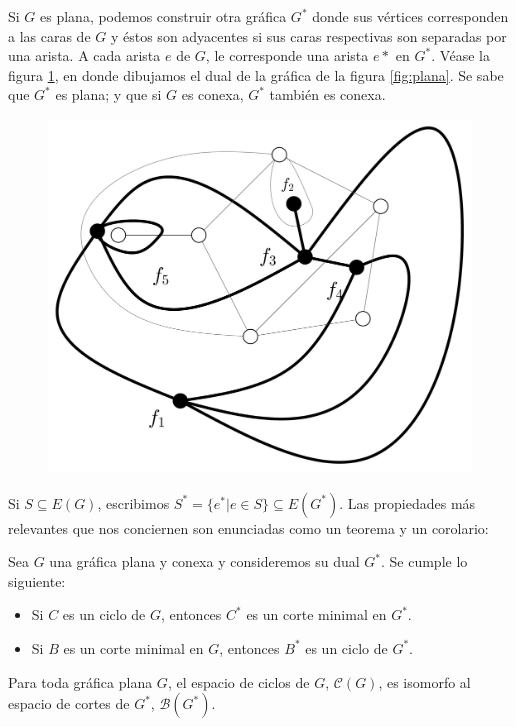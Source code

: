 Si $G$ es plana, podemos construir otra gráfica $G^{*}$ donde sus vértices corresponden a las caras de $G$ y éstos son adyacentes si sus caras respectivas son separadas por una arista. A cada arista $e$ de $G$, le corresponde una arista $e*$ en $G^{*}$. Véase la figura \ref{fig:dual}, en donde dibujamos el dual de la gráfica de la figura \ref{fig:plana}. Se sabe que $G^{*}$ es plana; y que si $G$ es conexa, $G^{*}$ también es conexa.
\begin{figure}[H]
    \centering
    \includegraphics[scale=0.2]{img/imgchapter4/dual.jpg}
    \caption{}
    \label{fig:dual}
\end{figure}

Si $S\subseteq E(G)$, escribimos $S^{*} = \{e^{*} | e\in S\} \subseteq E(G^{*})$. Las propiedades más relevantes que nos conciernen son enunciadas como un teorema y un corolario:

\begin{teo}
Sea $G$ una gráfica plana y conexa y consideremos su dual $G^{*}$. Se cumple lo siguiente: 
\begin{itemize}
    \item Si $C$ es un ciclo de $G$, entonces $C^{*}$ es un corte minimal en $G^{*}$.
    \item Si $B$ es un corte minimal en $G$, entonces $B^{*}$ es un ciclo de $G^{*}$.
\end{itemize}
\end{teo}

\begin{cor}
Para toda gráfica plana $G$, el espacio de ciclos de $G$, $\mathcal{C}(G)$, es isomorfo al espacio de cortes de $G^{*}$, $\mathcal{B}(G^{*})$.
\end{cor}

